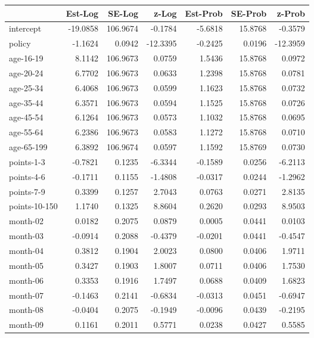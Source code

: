 \documentclass[10pt]{article}
\begin{document}
\begin{table}[ht]
\centering
\begin{tabular}{lrrrrrr}
  \hline
 & Est-Log & SE-Log & z-Log & Est-Prob & SE-Prob & z-Prob \\ 
  \hline
intercept & -19.0858 & 106.9674 & -0.1784 & -5.6818 & 15.8768 & -0.3579 \\ 
  policy & -1.1624 & 0.0942 & -12.3395 & -0.2425 & 0.0196 & -12.3959 \\ 
  age-16-19 & 8.1142 & 106.9673 & 0.0759 & 1.5436 & 15.8768 & 0.0972 \\ 
  age-20-24 & 6.7702 & 106.9673 & 0.0633 & 1.2398 & 15.8768 & 0.0781 \\ 
  age-25-34 & 6.4068 & 106.9673 & 0.0599 & 1.1623 & 15.8768 & 0.0732 \\ 
  age-35-44 & 6.3571 & 106.9673 & 0.0594 & 1.1525 & 15.8768 & 0.0726 \\ 
  age-45-54 & 6.1264 & 106.9673 & 0.0573 & 1.1032 & 15.8768 & 0.0695 \\ 
  age-55-64 & 6.2386 & 106.9673 & 0.0583 & 1.1272 & 15.8768 & 0.0710 \\ 
  age-65-199 & 6.3892 & 106.9674 & 0.0597 & 1.1592 & 15.8769 & 0.0730 \\ 
  points-1-3 & -0.7821 & 0.1235 & -6.3344 & -0.1589 & 0.0256 & -6.2113 \\ 
  points-4-6 & -0.1711 & 0.1155 & -1.4808 & -0.0317 & 0.0244 & -1.2962 \\ 
  points-7-9 & 0.3399 & 0.1257 & 2.7043 & 0.0763 & 0.0271 & 2.8135 \\ 
  points-10-150 & 1.1740 & 0.1325 & 8.8604 & 0.2620 & 0.0293 & 8.9503 \\ 
  month-02 & 0.0182 & 0.2075 & 0.0879 & 0.0005 & 0.0441 & 0.0103 \\ 
  month-03 & -0.0914 & 0.2088 & -0.4379 & -0.0201 & 0.0441 & -0.4547 \\ 
  month-04 & 0.3812 & 0.1904 & 2.0023 & 0.0800 & 0.0406 & 1.9711 \\ 
  month-05 & 0.3427 & 0.1903 & 1.8007 & 0.0711 & 0.0406 & 1.7530 \\ 
  month-06 & 0.3353 & 0.1916 & 1.7497 & 0.0688 & 0.0409 & 1.6823 \\ 
  month-07 & -0.1463 & 0.2141 & -0.6834 & -0.0313 & 0.0451 & -0.6947 \\ 
  month-08 & -0.0404 & 0.2075 & -0.1949 & -0.0096 & 0.0439 & -0.2195 \\ 
  month-09 & 0.1161 & 0.2011 & 0.5771 & 0.0238 & 0.0427 & 0.5585 \\ 

\end{tabular}
\end{table}
\end{document}
